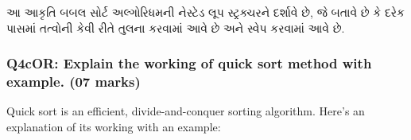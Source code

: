 \begin{Shaded}
\begin{Highlighting}[]
\end{Highlighting}
\end{Shaded}

આ આકૃતિ બબલ સોર્ટ અલ્ગોરિધમની નેસ્ટેડ લૂપ સ્ટ્રક્ચરને દર્શાવે છે, જે બતાવે છે કે દરેક પાસમાં
તત્વોની કેવી રીતે તુલના કરવામાં આવે છે અને સ્વેપ કરવામાં આવે છે.

\hypertarget{q4cor-explain-the-working-of-quick-sort-method-with-example.-07-marks}{%
\subsubsection{Q4cOR: Explain the working of quick sort method with
example. (07
marks)}\label{q4cor-explain-the-working-of-quick-sort-method-with-example.-07-marks}}

Quick sort is an efficient, divide-and-conquer sorting algorithm. Here's
an explanation of its working with an example:

